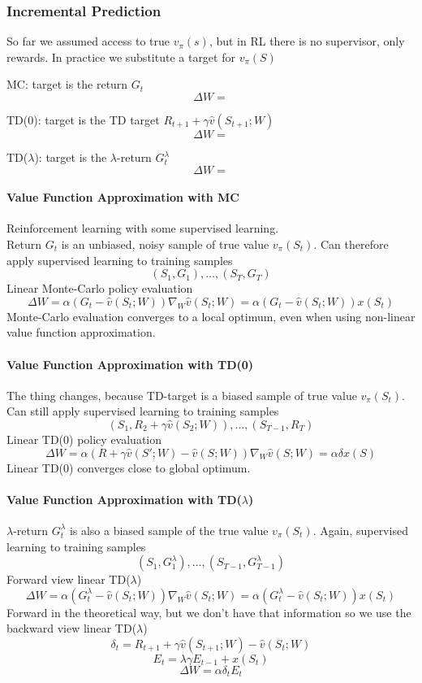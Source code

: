 \documentclass[10pt]{report}
\begin{document}
\subsubsection{Incremental Prediction}
So far we assumed access to true $v_\pi(s)$, but in RL there is no supervisor, only rewards. In practice we substitute a target for $v_\pi(S)$
\begin{list}{}{}
	\item MC: target is the return $G_t$
	$$\Delta W=$$
	\item TD(0): target is the TD target $R_{t+1} + \gamma\hat{v}(S_{t+1};W)$
	$$\Delta W=$$
	\item TD($\lambda$): target is the $\lambda$-return $G_t^\lambda$
	$$\Delta W=$$
\end{list}
\paragraph{Value Function Approximation with MC} Reinforcement learning with some supervised learning.\\
Return $G_t$ is an unbiased, noisy sample of true value $v_\pi(S_t)$. Can therefore apply supervised learning to training samples
$$(S_1,G_1),\ldots,(S_T,G_T)$$
Linear Monte-Carlo policy evaluation
$$\Delta W= \alpha(G_t-\hat{v}(S_t;W))\nabla_W\hat{v}(S_t;W)=\alpha(G_t-\hat{v}(S_t;W))x(S_t)$$
Monte-Carlo evaluation converges to a local optimum, even when using non-linear value function approximation.
\paragraph{Value Function Approximation with TD(0)} The thing changes, because TD-target is a biased sample of true value $v_\pi(S_t)$. Can still apply supervised learning to training samples
$$(S_1,R_2+\gamma\hat{v}(S_2;W)),\ldots,(S_{T-1},R_T)$$
Linear TD(0) policy evaluation
$$\Delta W = \alpha(R + \gamma\hat{v}(S';W)-\hat{v}(S;W))\nabla_W\hat{v}(S;W) = \alpha\delta x(S)$$
Linear TD(0) converges close to global optimum.
\paragraph{Value Function Approximation with TD($\lambda$)} $\lambda$-return $G_t^\lambda$ is also a biased sample of the true value $v_\pi(S_t)$. Again, supervised learning to training samples
$$(S_1,G_1^\lambda),\ldots,(S_{T-1},G_{T-1}^\lambda)$$
Forward view linear TD($\lambda$)
$$\Delta W = \alpha(G_t^\lambda-\hat{v}(S_t;W))\nabla_W\hat{v}(S_t;W)=\alpha(G_t^\lambda - \hat{v}(S_t;W))x(S_t)$$
Forward in the theoretical way, but we don't have that information so we use the backward view linear TD($\lambda$)
$$\delta_t = R_{t+1} + \gamma\hat{v}(S_{t+1};W)-\hat{v}(S_t;W)$$
$$E_t=\lambda\gamma E_{t-1} + x(S_t)$$
$$\Delta W = \alpha\delta_t E_t$$
\end{document}

